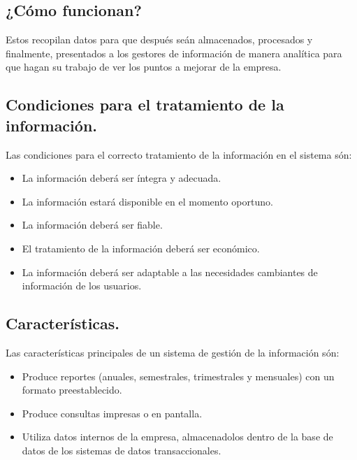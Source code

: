 \documentclass[
]{article}
\providecommand{\tightlist}{%
  \setlength{\itemsep}{0pt}\setlength{\parskip}{0pt}}
\begin{document}
\hypertarget{cuxf3mo-funcionan}{%
\subsection{¿Cómo funcionan?}\label{cuxf3mo-funcionan}}

Estos recopilan datos para que después seán almacenados, procesados y
finalmente, presentados a los gestores de información de manera
analítica para que hagan su trabajo de ver los puntos a mejorar de la
empresa.

\hypertarget{condiciones-para-el-tratamiento-de-la-informaciuxf3n.}{%
\subsection{Condiciones para el tratamiento de la
información.}\label{condiciones-para-el-tratamiento-de-la-informaciuxf3n.}}

Las condiciones para el correcto tratamiento de la información en el
sistema són:

\begin{itemize}
\tightlist
\item
  La información deberá ser íntegra y adecuada.
\item
  La información estará disponible en el momento oportuno.
\item
  La información deberá ser fiable.
\item
  El tratamiento de la información deberá ser económico.
\item
  La información deberá ser adaptable a las necesidades cambiantes de
  información de los usuarios.
\end{itemize}

\hypertarget{caracteruxedsticas.}{%
\subsection{Características.}\label{caracteruxedsticas.}}

Las características principales de un sistema de gestión de la
información són:

\begin{itemize}
\tightlist
\item
  Produce reportes (anuales, semestrales, trimestrales y mensuales) con
  un formato preestablecido.
\item
  Produce consultas impresas o en pantalla.
\item
  Utiliza datos internos de la empresa, almacenadolos dentro de la base
  de datos de los sistemas de datos transaccionales.
\end{itemize}
\end{document}
